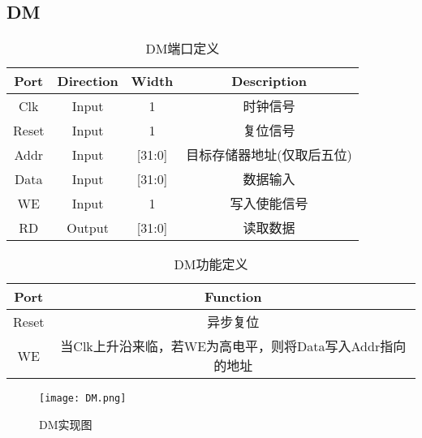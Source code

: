 \documentclass[UTF8]{ctexart}
\begin{document}
\subsection{DM}
\begin{table}[H]
	\centering
	\begin{threeparttable}
		\caption{DM端口定义}
		\begin{tabular}{cccc}
			\toprule
			\rowcolor{mypink}
			\textbf{Port} & \textbf{Direction} & \textbf{Width} & \textbf{Description}       \\
			\midrule
			Clk           & Input              & 1              & 时钟信号                   \\
			\midrule
			Reset         & Input              & 1              & 复位信号                   \\
			\midrule
			Addr          & Input              & [31:0]         & 目标存储器地址(仅取后五位) \\

			\midrule
			Data          & Input              & [31:0]         & 数据输入                   \\
			\midrule
			WE            & Input              & 1              & 写入使能信号               \\
			\midrule
			RD            & Output             & [31:0]         & 读取数据                   \\
			\midrule
		\end{tabular}
	\end{threeparttable}
\end{table}
\begin{table}[H]
	\centering
	\begin{threeparttable}
		\caption{DM功能定义}
		\begin{tabular}{cc}
			\toprule
			\rowcolor{mypink}
			\textbf{Port} & \textbf{Function}                                         \\
			\midrule
			Reset         & 异步复位                                                  \\
			\midrule
			WE            & 当Clk上升沿来临，若WE为高电平，则将Data写入Addr指向的地址 \\
			\midrule
		\end{tabular}
	\end{threeparttable}
\end{table}
\begin{figure}[H]
	\centering
	\texttt{[image: DM.png]}
	\caption{DM实现图}
\end{figure}
\newpage
\end{document}
